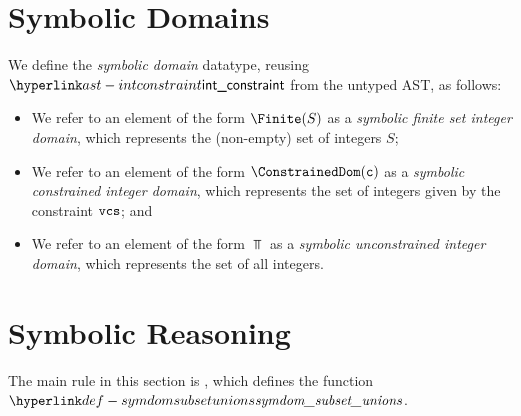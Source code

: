 \section{Symbolic Domains\label{sec:Symbolic Domains}}
\hypertarget{def-symbolicdomain}{}

We define the \emph{symbolic domain} datatype, reusing $\intconstraint$ from the untyped AST,
as follows:


\begin{itemize}
  \item We refer to an element of the form $\Finite(S)$ as a \emph{symbolic finite set integer domain},
        which represents the (non-empty) set of integers $S$;
  \item We refer to an element of the form $\ConstrainedDom(\vc)$ as a \emph{symbolic constrained integer domain},
        which represents the set of integers given by the constraint $\texttt{vcs}$; and
  \item We refer to an element of the form $\Top$ as a \emph{symbolic unconstrained integer domain},
        which represents the set of all integers.
\end{itemize}

\section{Symbolic Reasoning\label{sec:Symbolic Reasoning}}

The main rule in this section is , which defines the function
$\symdomsubsetunions$.

